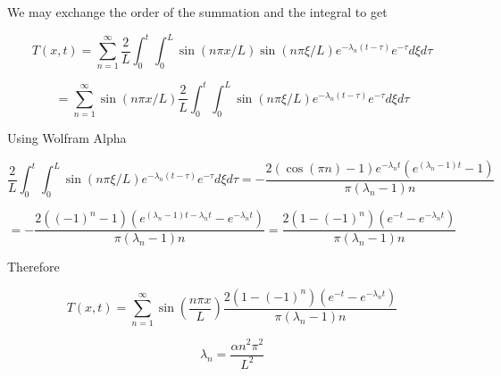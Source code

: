 \documentclass[11pt]{article}
\begin{document}
We may exchange the order of the summation and the integral to get

\begin{equation}
	T(x,t) 
	= 
	\sum_{n=1}^{\infty}
	\frac{2}{L} 
	\int_0^t \int_0^L 
	\sin(n\pi x/L)
	\sin(n\pi \xi/L)
	e^{-\lambda_n (t-\tau)}
	e^{-\tau}
	d\xi d\tau
\end{equation}

\begin{equation}
	= 
	\sum_{n=1}^{\infty}
	\sin(n\pi x/L)
	\frac{2}{L} 
	\int_0^t \int_0^L 
	\sin(n\pi \xi/L)
	e^{-\lambda_n (t-\tau)}
	e^{-\tau}
	d\xi d\tau
\end{equation}

Using Wolfram Alpha

\begin{equation}
	\frac{2}{L}
	\int_0^t \int_0^L 
	\sin(n\pi \xi/L)
	e^{-\lambda_n (t-\tau)}
	e^{-\tau}
	d\xi d\tau
	=
	- \frac{2 (\cos(\pi n) - 1) e^{-\lambda_n t} (e^{(\lambda_n-1)t}-1)}{\pi (\lambda_n-1)n}
\end{equation}

\begin{equation}
	=
	- \frac{2 ((-1)^n - 1) (e^{(\lambda_n-1)t-\lambda_n t}-e^{-\lambda_n t})}{\pi (\lambda_n-1)n}
	=
	\frac{2 (1 - (-1)^n) (e^{-t}-e^{-\lambda_n t})}{\pi (\lambda_n-1)n}
\end{equation}

Therefore

\begin{equation}
	\boxed{
	T(x,t) 
	=
	\sum_{n=1}^{\infty}
	\sin \left( \frac{n\pi x}{L} \right)
	\frac{2 (1 - (-1)^n) (e^{-t}-e^{-\lambda_n t})}{\pi (\lambda_n-1)n}
	}
\end{equation}


\begin{equation}
	\boxed{
	\lambda_n = \frac{\alpha n^2\pi^2}{L^2}
	}
\end{equation}
\end{document}
